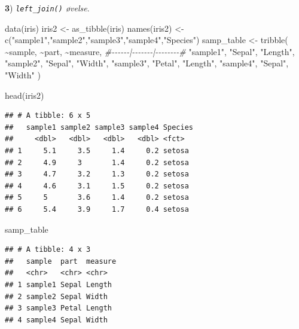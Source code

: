 \documentclass[
]{book}
\newenvironment{Shaded}{\begin{snugshade}}{\end{snugshade}}
\newcommand{\CommentTok}[1]{\textcolor[rgb]{0.56,0.35,0.01}{\textit{#1}}}
\newcommand{\FunctionTok}[1]{\textcolor[rgb]{0.00,0.00,0.00}{#1}}
\newcommand{\NormalTok}[1]{#1}
\newcommand{\OtherTok}[1]{\textcolor[rgb]{0.56,0.35,0.01}{#1}}
\newcommand{\SpecialCharTok}[1]{\textcolor[rgb]{0.00,0.00,0.00}{#1}}
\newcommand{\StringTok}[1]{\textcolor[rgb]{0.31,0.60,0.02}{#1}}
\begin{document}
\textbf{3}) \emph{\texttt{left\_join()} øvelse}.

\begin{Shaded}
\begin{Highlighting}[]
\FunctionTok{data}\NormalTok{(iris)}
\NormalTok{iris2 }\OtherTok{\textless{}{-}} \FunctionTok{as\_tibble}\NormalTok{(iris)}
\FunctionTok{names}\NormalTok{(iris2) }\OtherTok{\textless{}{-}} \FunctionTok{c}\NormalTok{(}\StringTok{"sample1"}\NormalTok{,}\StringTok{"sample2"}\NormalTok{,}\StringTok{"sample3"}\NormalTok{,}\StringTok{"sample4"}\NormalTok{,}\StringTok{"Species"}\NormalTok{)}
\NormalTok{samp\_table }\OtherTok{\textless{}{-}} \FunctionTok{tribble}\NormalTok{(}
                      \SpecialCharTok{\textasciitilde{}}\NormalTok{sample, }\SpecialCharTok{\textasciitilde{}}\NormalTok{part, }\SpecialCharTok{\textasciitilde{}}\NormalTok{measure,}
                      \CommentTok{\#{-}{-}{-}{-}{-}{-}|{-}{-}{-}{-}{-}{-}{-}|{-}{-}{-}{-}{-}{-}{-}{-}\#}
                      \StringTok{"sample1"}\NormalTok{, }\StringTok{"Sepal"}\NormalTok{, }\StringTok{"Length"}\NormalTok{,}
                      \StringTok{"sample2"}\NormalTok{, }\StringTok{"Sepal"}\NormalTok{, }\StringTok{"Width"}\NormalTok{,}
                      \StringTok{"sample3"}\NormalTok{, }\StringTok{"Petal"}\NormalTok{, }\StringTok{"Length"}\NormalTok{,}
                      \StringTok{"sample4"}\NormalTok{, }\StringTok{"Sepal"}\NormalTok{, }\StringTok{"Width"}
\NormalTok{                     )}


\FunctionTok{head}\NormalTok{(iris2)}
\end{Highlighting}
\end{Shaded}

\begin{verbatim}
## # A tibble: 6 x 5
##   sample1 sample2 sample3 sample4 Species
##     <dbl>   <dbl>   <dbl>   <dbl> <fct>  
## 1     5.1     3.5     1.4     0.2 setosa 
## 2     4.9     3       1.4     0.2 setosa 
## 3     4.7     3.2     1.3     0.2 setosa 
## 4     4.6     3.1     1.5     0.2 setosa 
## 5     5       3.6     1.4     0.2 setosa 
## 6     5.4     3.9     1.7     0.4 setosa
\end{verbatim}

\begin{Shaded}
\begin{Highlighting}[]
\NormalTok{samp\_table}
\end{Highlighting}
\end{Shaded}

\begin{verbatim}
## # A tibble: 4 x 3
##   sample  part  measure
##   <chr>   <chr> <chr>  
## 1 sample1 Sepal Length 
## 2 sample2 Sepal Width  
## 3 sample3 Petal Length 
## 4 sample4 Sepal Width
\end{verbatim}
\end{document}
